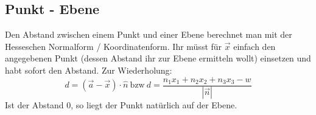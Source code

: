 \subsection{Punkt - Ebene}
Den Abstand zwischen einem Punkt und einer Ebene berechnet man mit der Hesseschen Normalform / Koordinatenform. Ihr müsst für \(\vec{x}\) einfach den angegebenen Punkt (dessen Abstand ihr zur Ebene ermitteln wollt) einsetzen und habt sofort den Abstand. Zur Wiederholung:
\[d=(\vec{a}-\vec{x})\cdot \hat{n} \mathrm{\ bzw\ } d=\frac{n_1x_1+n_2x_2+n_3x_3-w}{|\vec{n}|}\]
Ist der Abstand 0, so liegt der Punkt natürlich auf der Ebene.
